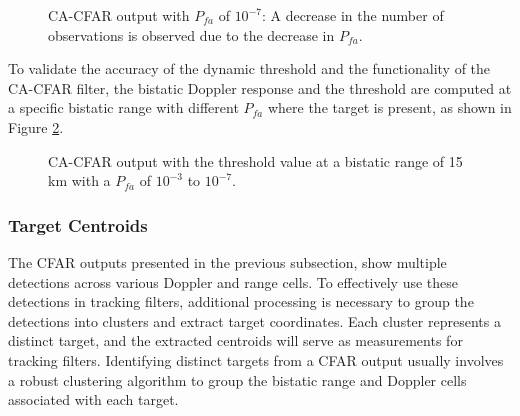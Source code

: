\begin{figure}[H]
    \centering
    
    \caption{CA-CFAR output with \(P_{fa}\) of \(10^{-7}\): A decrease in the number of observations is observed due to the decrease in \(P_{fa}\).}
    \label{fig:ca-cfar2}
\end{figure}

To validate the accuracy of the dynamic threshold and the functionality of the \ac{CA-CFAR} filter, the bistatic Doppler response and the threshold are computed at a specific bistatic range with different \(P_{fa}\) where the target is present, as shown in Figure \ref{fig:cfarValidation}.

\begin{figure}[H]
    \centering
    
    \caption{CA-CFAR output with the threshold value at a bistatic range of 15 km with a \(P_{fa}\) of \(10^{-3}\) to \(10^{-7}\).}
    \label{fig:cfarValidation}
\end{figure}



\subsubsection{Target  Centroids}
The \ac{CFAR} outputs presented in the previous subsection, show multiple detections across various  Doppler and range cells. To effectively use these detections in tracking filters, additional processing is necessary to group the detections into clusters and extract target coordinates. Each cluster represents a distinct target, and the extracted centroids will serve as measurements for tracking filters. Identifying distinct targets from a \ac{CFAR} output usually involves a robust clustering algorithm to group the bistatic range and Doppler cells associated with each target.

